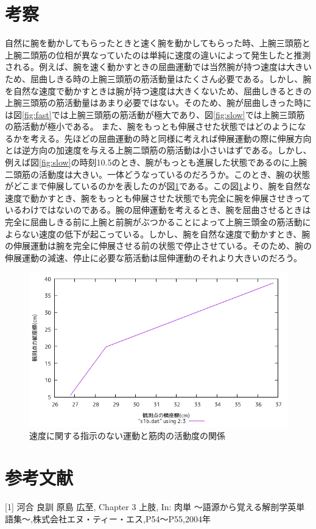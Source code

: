 \documentclass{jsarticle}
\begin{document}
\section{考察}
自然に腕を動かしてもらったときと速く腕を動かしてもらった時、上腕三頭筋と上腕二頭筋の位相が異なっていたのは単純に速度の違いによって発生したと推測される。例えば、腕を速く動かすときの屈曲運動では当然腕が持つ速度は大きいため、屈曲しきる時の上腕三頭筋の筋活動量はたくさん必要である。しかし、腕を自然な速度で動かすときは腕が持つ速度は大きくないため、屈曲しきるときの上腕三頭筋の筋活動量はあまり必要ではない。そのため、腕が屈曲しきった時には図\ref{fig:fast}では上腕三頭筋の筋活動が極大であり、図\ref{fig:slow}では上腕三頭筋の筋活動が極小である。
また、腕をもっとも伸展させた状態ではどのようになるかを考える。先ほどの屈曲運動の時と同様に考えれば伸展運動の際に伸展方向とは逆方向の加速度を与える上腕二頭筋の筋活動は小さいはずである。しかし、例えば図\ref{fig:slow}の時刻10.5のとき、腕がもっとも進展した状態であるのに上腕二頭筋の活動度は大きい。一体どうなっているのだろうか。このとき、腕の状態がどこまで伸展しているのかを表したのが図\ref{fig:arm}である。この図\ref{fig:arm}より、腕を自然な速度で動かすとき、腕をもっとも伸展させた状態でも完全に腕を伸展させきっているわけではないのである。腕の屈伸運動を考えるとき、腕を屈曲させるときは完全に屈曲しきる前に上腕と前腕がぶつかることによって上腕三頭金の筋活動によらない速度の低下が起こっている。しかし、腕を自然な速度で動かすとき、腕の伸展運動は腕を完全に伸展させる前の状態で停止させている。そのため、腕の伸展運動の減速、停止に必要な筋活動は屈伸運動のそれより大きいのだろう。

\begin{figure}[b]
  \begin{center}
    \includegraphics[width=15cm]{images/armmodel.png}
  \end{center}
  \caption{速度に関する指示のない運動と筋肉の活動度の関係}
  \label{fig:arm}
\end{figure}


\section*{参考文献}
[1] 河合 良訓 原島 広至, Chapter 3 上肢, In: 肉単 〜語源から覚える解剖学英単語集〜,株式会社エヌ・ティー・エス,P54〜P55,2004年
\end{document}
